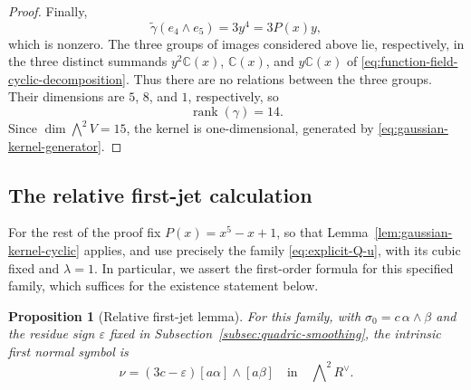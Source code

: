 \documentclass[10pt,a4paper]{amsart}
\newtheorem{proposition}[theorem]{Proposition}
\begin{document}
\begin{proof}
Finally,
\begin{equation*}
\widetilde\gamma(e_4\wedge e_5)=3y^4=3P(x)y,
\end{equation*}
which is nonzero.  The three groups of images considered above lie,
respectively, in the three distinct summands
$y^2\mathbb C(x)$, $\mathbb C(x)$, and $y\mathbb C(x)$ of
\eqref{eq:function-field-cyclic-decomposition}.  Thus there are no
relations between the three groups.  Their dimensions are $5$, $8$, and
$1$, respectively, so
\begin{equation*}
\operatorname{rank}(\gamma)=14.
\end{equation*}
Since $\dim\bigwedge^2V=15$, the kernel is one-dimensional, generated by \eqref{eq:gaussian-kernel-generator}.
\end{proof}

\subsection{The relative first-jet calculation}
\label{subsec:relative-first-jet}

\begingroup
For the rest of the proof fix $P(x)=x^5-x+1$, so that
Lemma~\ref{lem:gaussian-kernel-cyclic} applies, and use precisely the
family \eqref{eq:explicit-Q-u}, with its cubic fixed and $\lambda=1$.
In particular, we assert the first-order formula for this specified
family, which suffices for the existence statement below.

\begin{proposition}[Relative first-jet lemma]
\label{prop:relative-first-jet}
For this family, with $\sigma_0=c\,\alpha\wedge\beta$ and the residue
sign $\varepsilon$ fixed in Subsection~\ref{subsec:quadric-smoothing},
the intrinsic first normal symbol is
\begin{equation}
\label{eq:relative-first-jet-formula}
\nu=(3c-\varepsilon)[a\alpha]\wedge[a\beta]
\quad\text{in}\quad\bigwedge\nolimits^2R^\vee.
\end{equation}
\end{proposition}
\end{document}
